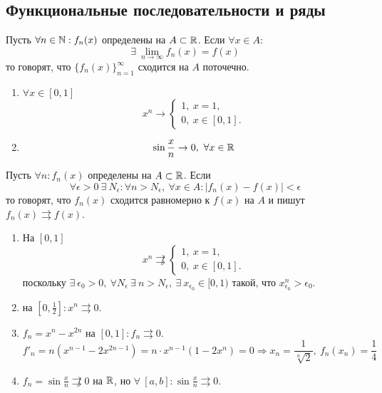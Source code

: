 \subsection{Функциональные последовательности и ряды}
\begin{definition}
    Пусть $\forall n\in \mathbb{N}: f_n(x)$ определены на $A\subset \mathbb{R}$. Если $\forall x\in A$: 
    \[\exists\ \lim\limits_{n\to\infty}f_n(x)=f(x)\]
    то говорят, что $\{f_n(x)\}_{n=1}^{\infty}$ сходится на $A$ поточечно.
\end{definition}
\begin{examples}\tab
    \begin{enumerate}
        \item $\forall x\in[0,1]$
        \[x^n\to \begin{cases}
            1,\ x=1,\\
            0,\ x\in [0,1].
        \end{cases}\]
        \item 
        \[\sin{\frac{x}{n}}\to 0,\ \forall x\in \mathbb{R}\]
    \end{enumerate}
\end{examples}
\begin{definition}
    Пусть $\forall n: f_n(x)$ определены на $A\subset \mathbb{R}$. Если 
    \[\forall \epsilon>0\ \exists\ N_{\epsilon}: \forall n>N_{\epsilon},\ \forall x\in A: |f_n(x)-f(x)|<\epsilon\]
    то говорят, что $f_n(x)$ сходится равномерно к $f(x)$ на $A$ и пишут $f_n(x)\rightrightarrows f(x)$.
\end{definition}
\begin{examples}\tab
    \begin{enumerate}
        \item На $[0,1]$
        \[x^n \not\rightrightarrows \begin{cases}
            1,\ x=1,\\
            0,\ x\in [0,1].
        \end{cases} \]
        поскольку $\exists\ \epsilon_0>0,\ \forall N_{\epsilon}\ \exists\ n>N_{\epsilon},\ \exists\ x_{\epsilon_0}\in [0,1)$ такой, что $x_{\epsilon_0}^n>\epsilon_0$.
        \item на $[0,\frac{1}{2}]: x^n\rightrightarrows 0$.
        \item $f_n=x^n-x^{2n}$ на $[0,1]: f_n\rightrightarrows 0$.
        \[f'_n=n(x^{n-1}-2x^{2n-1})=n\cdot x^{n-1}(1-2x^n)=0 \Rightarrow x_n=\frac{1}{\sqrt[n]{2}},\ f_n(x_n)=\frac{1}{4}\]
        \item $f_n=\sin{\frac{x}{n}} \not\rightrightarrows 0$ на $\mathbb{R}$, но $\forall\ [a,b]: \sin{\frac{x}{n}}\rightrightarrows 0$.
    \end{enumerate}
\end{examples}

